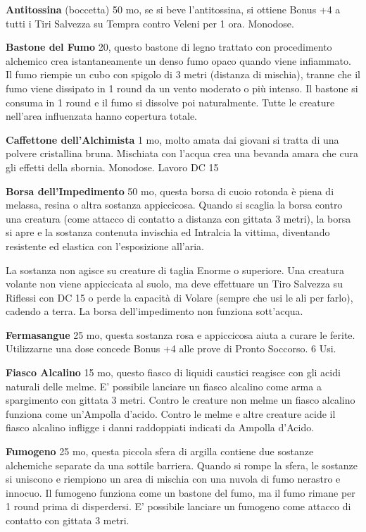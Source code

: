 \documentclass[12pt,a4paper,twoside,openany]{book}
\begin{document}
\begin{multicols}{2}
\textbf{Antitossina} (boccetta) 50 mo, se si beve l'antitossina, si ottiene Bonus +4 a tutti i Tiri Salvezza su Tempra contro Veleni per 1 ora. Monodose. 

\textbf{Bastone del Fumo} 20, questo bastone di legno trattato con procedimento alchemico crea istantaneamente un denso fumo opaco quando viene infiammato. Il fumo riempie un cubo con spigolo di 3 metri (distanza di mischia), tranne che il fumo viene dissipato in 1 round da un vento moderato o più intenso. Il bastone si consuma in 1 round e il fumo si dissolve poi naturalmente. Tutte le creature nell'area influenzata hanno copertura totale.

\textbf{Caffettone dell'Alchimista} 1 mo, molto amata dai giovani si tratta di una polvere cristallina bruna. Mischiata con l'acqua crea una bevanda amara che cura gli effetti della sbornia. Monodose. Lavoro DC 15

\textbf{Borsa dell'Impedimento} 50 mo, questa borsa di cuoio rotonda è piena di melassa, resina o altra sostanza appiccicosa. Quando si scaglia la borsa contro una creatura (come attacco di contatto a distanza con gittata 3 metri), la borsa si apre e la sostanza contenuta invischia ed Intralcia la vittima, diventando resistente ed elastica con l'esposizione all'aria.

La sostanza non agisce su creature di taglia Enorme o superiore. Una creatura volante non viene appiccicata al suolo, ma deve effettuare un Tiro Salvezza su Riflessi con DC 15 o perde la capacità di Volare (sempre che usi le ali per farlo), cadendo a terra. La borsa dell'impedimento non funziona sott'acqua.

\textbf{Fermasangue} 25 mo, questa sostanza rosa e appiccicosa aiuta a curare le ferite. Utilizzarne una dose concede Bonus +4 alle prove di Pronto Soccorso. 6 Usi.

\textbf{Fiasco Alcalino} 15 mo, questo fiasco di liquidi caustici reagisce con gli acidi naturali delle melme. E' possibile lanciare un fiasco alcalino come arma a spargimento con gittata 3 metri. Contro le creature non melme un fiasco alcalino funziona come un'Ampolla d'acido. Contro le melme e altre creature acide il fiasco alcalino infligge i danni raddoppiati indicati da Ampolla d'Acido. 

\textbf{Fumogeno} 25 mo, questa piccola sfera di argilla contiene due sostanze alchemiche separate da una sottile barriera. Quando si rompe la sfera, le sostanze si uniscono e riempiono un area di mischia con una nuvola di fumo nerastro e innocuo. Il fumogeno funziona come un bastone del fumo, ma il fumo rimane per 1 round prima di disperdersi. E' possibile lanciare un fumogeno come attacco di contatto con gittata 3 metri.


\end{multicols}
\end{document}
